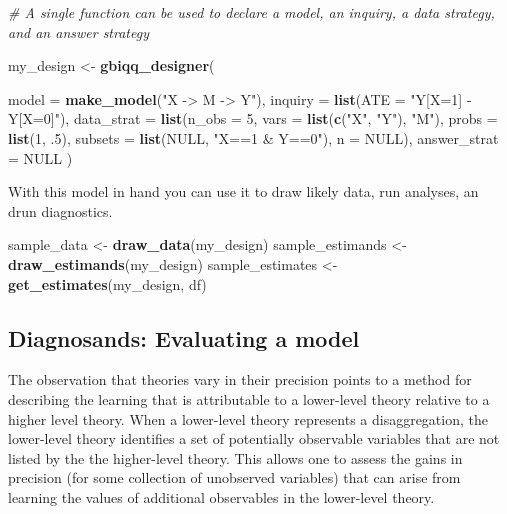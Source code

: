 \documentclass[12pt,]{book}
\newenvironment{Shaded}{\begin{snugshade}}{\end{snugshade}}
\newcommand{\CommentTok}[1]{\textcolor[rgb]{0.56,0.35,0.01}{\textit{#1}}}
\newcommand{\DataTypeTok}[1]{\textcolor[rgb]{0.13,0.29,0.53}{#1}}
\newcommand{\DecValTok}[1]{\textcolor[rgb]{0.00,0.00,0.81}{#1}}
\newcommand{\FloatTok}[1]{\textcolor[rgb]{0.00,0.00,0.81}{#1}}
\newcommand{\KeywordTok}[1]{\textcolor[rgb]{0.13,0.29,0.53}{\textbf{#1}}}
\newcommand{\NormalTok}[1]{#1}
\newcommand{\OtherTok}[1]{\textcolor[rgb]{0.56,0.35,0.01}{#1}}
\newcommand{\StringTok}[1]{\textcolor[rgb]{0.31,0.60,0.02}{#1}}
\begin{document}
\begin{Shaded}
\begin{Highlighting}[]
\CommentTok{# A single function can be used to declare a model, an inquiry, a data strategy, and an answer strategy}

\NormalTok{my_design <-}\StringTok{ }\KeywordTok{gbiqq_designer}\NormalTok{(}
  
   \DataTypeTok{model           =} \KeywordTok{make_model}\NormalTok{(}\StringTok{"X -> M -> Y"}\NormalTok{),}
   \DataTypeTok{inquiry         =} \KeywordTok{list}\NormalTok{(}\DataTypeTok{ATE =} \StringTok{"Y[X=1] - Y[X=0]"}\NormalTok{),}
   \DataTypeTok{data_strat      =} \KeywordTok{list}\NormalTok{(}\DataTypeTok{n_obs =} \DecValTok{5}\NormalTok{, }
                          \DataTypeTok{vars =} \KeywordTok{list}\NormalTok{(}\KeywordTok{c}\NormalTok{(}\StringTok{"X"}\NormalTok{, }\StringTok{"Y"}\NormalTok{), }\StringTok{"M"}\NormalTok{), }
                          \DataTypeTok{probs =} \KeywordTok{list}\NormalTok{(}\DecValTok{1}\NormalTok{, }\FloatTok{.5}\NormalTok{), }
                          \DataTypeTok{subsets =} \KeywordTok{list}\NormalTok{(}\OtherTok{NULL}\NormalTok{, }\StringTok{"X==1 & Y==0"}\NormalTok{),}
                          \DataTypeTok{n =} \OtherTok{NULL}\NormalTok{),}
   \DataTypeTok{answer_strat  =} \OtherTok{NULL}
\NormalTok{)}
\end{Highlighting}
\end{Shaded}

With this model in hand you can use it to draw likely data, run analyses, an drun diagnostics.

\begin{Shaded}
\begin{Highlighting}[]
\NormalTok{sample_data      <-}\StringTok{ }\KeywordTok{draw_data}\NormalTok{(my_design)}
\NormalTok{sample_estimands <-}\StringTok{ }\KeywordTok{draw_estimands}\NormalTok{(my_design)}
\NormalTok{sample_estimates <-}\StringTok{ }\KeywordTok{get_estimates}\NormalTok{(my_design, df)}
\end{Highlighting}
\end{Shaded}

\hypertarget{diagnosands-evaluating-a-model}{%
\subsection{Diagnosands: Evaluating a model}\label{diagnosands-evaluating-a-model}}

The observation that theories vary in their precision points to a method for describing the learning that is attributable to a lower-level theory relative to a higher level theory. When a lower-level theory represents a disaggregation, the lower-level theory identifies a set of potentially observable variables that are not listed by the the higher-level theory. This allows one to assess the gains in precision (for some collection of unobserved variables) that can arise from learning the values of additional observables in the lower-level theory.
\end{document}
